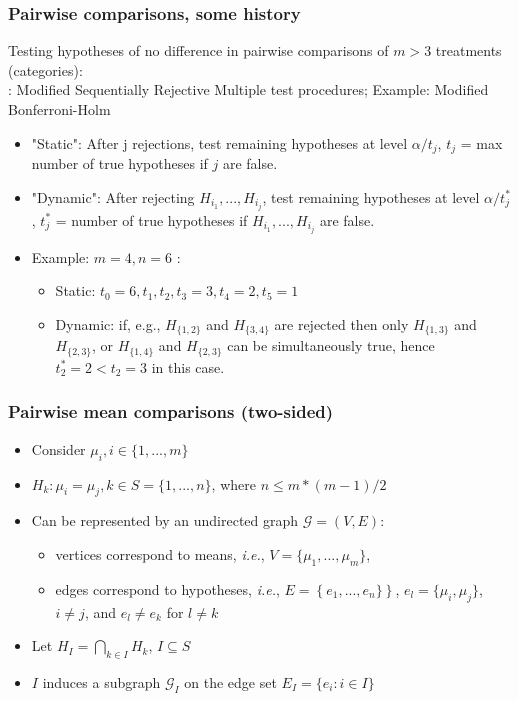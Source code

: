 \documentclass[bigger]{beamer}
\begin{document}
\begin{frame}
\frametitle{Pairwise comparisons, some history}

Testing hypotheses of no difference in pairwise comparisons of $m>3$ treatments (categories):\\
\cite{shaffer1986modified}: Modified Sequentially Rejective Multiple test procedures; Example: Modified Bonferroni-Holm
\begin{itemize}
  \item "Static":  After j rejections, test remaining hypotheses at level $\alpha/t_j$, $t_j$ = max number of true hypotheses if $j$ are false.
  \item "Dynamic": After rejecting $H_{i_1},...,H_{i_j}$, test remaining hypotheses at level $\alpha/t^*_j$,  $t^*_j$ = number of true hypotheses if $H_{i_1},...,H_{i_j}$ are false.
  \item Example: $m=4, n=6$ :
    \begin{itemize}
      \item Static: $t_0=6, t_1,t_2,t_3 = 3, t_4=2, t_5=1$
      \item Dynamic: if, e.g., $H_{\{1,2\}}$ and $H_{\{3,4\}}$ are rejected then only $H_{\{1,3\}}$ and $H_{\{2,3\}}$, or $H_{\{1,4\}}$ and $H_{\{2,3\}}$ can be simultaneously true, hence $t^*_2 = 2 < t_2 =3$ in this case.
       \end{itemize}
\end{itemize}
\end{frame}




\begin{frame}
\frametitle{Pairwise mean comparisons (two-sided)}
\begin{itemize}

\item Consider $\mu_i, i \in \{1,...,m\}$

\item $H_k: \mu_i = \mu_j, k \in S = \{1,...,n\}$, where $n \leq m*(m-1)/2$

\item Can be represented by an undirected graph $\mathscr{G} = (V,E)$:
\begin{itemize}
\item vertices correspond to means, \emph{i.e.}, $V = \{\mu_1,...,\mu_m\}$,
\item edges correspond to hypotheses, \emph{i.e.}, $E =
      \left\{e_1,...,e_n\} \right\}$, $e_l = \{\mu_i,\mu_j\}$, $i \neq
      j$, and $e_l \neq e_k$ for $l \neq k$
\end{itemize}
\item Let $H_I = \bigcap_{k \in I} H_k$, $I \subseteq S$
\item $I$ induces a subgraph $\mathscr{G}_I$ on the edge set $E_I=\{e_i: i
  \in I\}$
\end{itemize} %
\end{frame}
\end{document}
